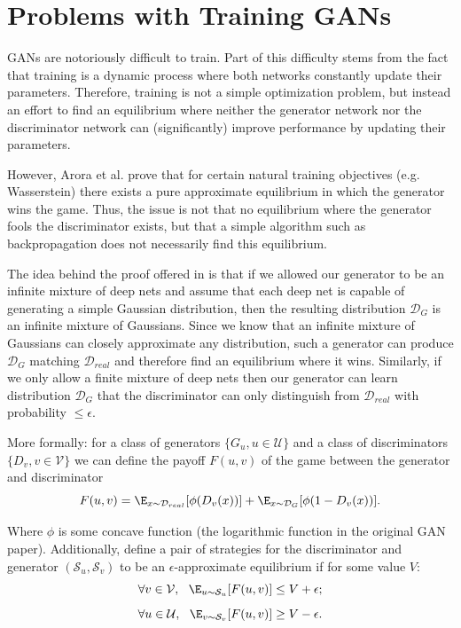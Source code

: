 \section{Problems with Training GANs}


GANs are notoriously difficult to train. Part of this difficulty stems from the fact that training is a dynamic process where both networks constantly update their parameters. Therefore, training is not a simple optimization problem, but instead an effort to find an equilibrium where neither the generator network nor the discriminator network can (significantly) improve performance by updating their parameters.

However, Arora et al. \cite{arora2017eq} prove that for certain natural training objectives (e.g. Wasserstein) there exists a pure approximate equilibrium in which the generator wins the game. Thus, the issue is not that no equilibrium where the generator fools the discriminator exists, but that a simple algorithm such as backpropagation does not necessarily find this equilibrium.

The idea behind the proof offered in \cite{arora2017eq} is that if we allowed our generator to be an infinite mixture of deep nets and assume that each deep net is capable of generating a simple Gaussian distribution, then the resulting distribution $\mathcal{D}_G$ is an infinite mixture of Gaussians. Since we know that an infinite mixture of Gaussians can closely approximate any distribution, such a generator can produce $\mathcal{D}_G$ matching $\mathcal{D}_{real}$ and therefore find an equilibrium where it wins. Similarly, if we only allow a finite mixture of deep nets then our generator can learn distribution $\mathcal{D}_G$ that the discriminator can only distinguish from $\mathcal{D}_{real}$ with probability $\leq \epsilon$.

More formally: for a class of generators $\{G_u, u \in \mathcal{U}\}$ and a class of discriminators $\{D_v, v \in \mathcal{V}\}$ we can define the payoff $F(u,v)$ of the game between the generator and discriminator
$$
F(u,v) = \E_{x \sim \mathcal{D}_{real}}[\phi{(D_v(x))}] + \E_{x \sim \mathcal{D}_G} [\phi(1 - D_v(x))].
$$

Where $\phi$ is some concave function (the logarithmic function in the original GAN paper). Additionally, define a pair of strategies for the discriminator and generator $(\mathcal{S}_u, \mathcal{S}_v)$ to be an $\epsilon$-approximate equilibrium if for some value $V$:
$$
\forall v \in \mathcal{V}, \:\:\: \E_{u \sim \mathcal{S}_u}[F(u,v)] \leq V + \epsilon;
$$
$$
\forall u \in \mathcal{U}, \:\:\: \E_{v \sim \mathcal{S}_v}[F(u,v)] \geq V - \epsilon.
$$

